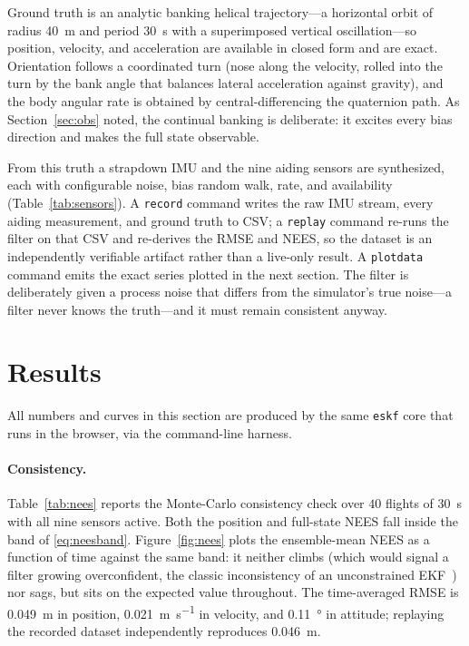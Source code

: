 \documentclass[11pt]{article}
\begin{document}
Ground truth is an analytic banking helical trajectory---a horizontal orbit of radius \SI{40}{\metre}
and period \SI{30}{\second} with a superimposed vertical oscillation---so position, velocity, and
acceleration are available in closed form and are exact. Orientation follows a coordinated turn (nose
along the velocity, rolled into the turn by the bank angle that balances lateral acceleration against
gravity), and the body angular rate is obtained by central-differencing the quaternion path. As
Section~\ref{sec:obs} noted, the continual banking is deliberate: it excites every bias direction and
makes the full state observable.

From this truth a strapdown IMU and the nine aiding sensors are synthesized, each with configurable
noise, bias random walk, rate, and availability (Table~\ref{tab:sensors}). A \texttt{record} command
writes the raw IMU stream, every aiding measurement, and ground truth to CSV; a \texttt{replay} command
re-runs the filter on that CSV and re-derives the RMSE and NEES, so the dataset is an independently
verifiable artifact rather than a live-only result. A \texttt{plotdata} command emits the exact series
plotted in the next section. The filter is deliberately given a process noise that differs from the
simulator's true noise---a filter never knows the truth---and it must remain consistent anyway.

\section{Results}
\label{sec:results}

All numbers and curves in this section are produced by the same \texttt{eskf} core that runs in the
browser, via the command-line harness.

\paragraph{Consistency.}
Table~\ref{tab:nees} reports the Monte-Carlo consistency check over $40$ flights of \SI{30}{\second}
with all nine sensors active. Both the position and full-state NEES fall inside the band of
\eqref{eq:neesband}. Figure~\ref{fig:nees} plots the ensemble-mean NEES as a function of time against
the same band: it neither climbs (which would signal a filter growing overconfident, the classic
inconsistency of an unconstrained EKF~\cite{huang2010}) nor sags, but sits on the expected value
throughout. The time-averaged RMSE is \SI{0.049}{\metre} in position, \SI{0.021}{\metre\per\second} in
velocity, and \SI{0.11}{\degree} in attitude; replaying the recorded dataset independently reproduces
\SI{0.046}{\metre}.
\end{document}
